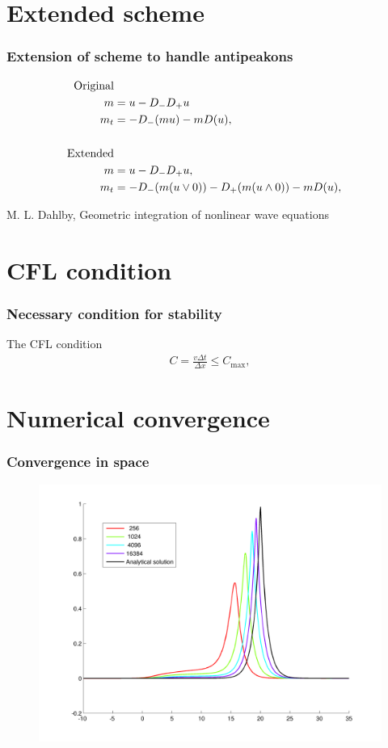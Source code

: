 \documentclass{beamer}
\begin{document}
\section*{Extended scheme}
\begin{frame}
\frametitle{Extension of scheme to handle antipeakons}
\begin{align*}
\text{Original} \\
m &= u - D_- D_+ u \notag \\
m_t &=- D_- ( m u ) - m D ( u ), \\ \\
\text{Extended} \\
m &= u - D_{-}D_{+}u, \notag \\ 
m_t &= -D_{-}(m(u \vee 0)) -D_{+}(m(u \wedge 0)) - mD(u), 
\end{align*}

\vspace{1cm}
\tiny{M. L. Dahlby, Geometric integration of nonlinear
wave equations}
\end{frame}


\section*{CFL condition}
\begin{frame}
\frametitle{Necessary condition for stability}
The CFL condition
\begin{align*}
C = \frac{v\Delta t}{\Delta x} \leq C_{\text{max}},
\end{align*}

\end{frame}


\section*{Numerical convergence}
\begin{frame}
\frametitle{Convergence in space}
\begin{figure}
\includegraphics[width=0.8\linewidth]{gfx/attimeT}
\end{figure}
\end{frame}
\end{document}
